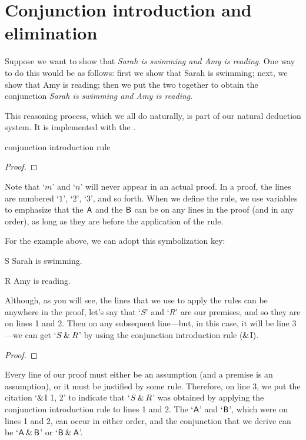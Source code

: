 \section{Conjunction introduction and elimination}\label{s:conj-rule}

Suppose we want to show that \textit{Sarah is swimming and Amy is reading}. One way to do this would be as follows: first we show that Sarah is swimming; next, we show that Amy is reading; then we put the two together to obtain the conjunction \textit{Sarah is swimming and Amy is reading}.

This reasoning process, which we all do naturally, is part of our natural deduction system. It is implemented with the . 
\begin{factboxy}{conjunction introduction rule}
\begin{proof}
	 
\end{proof}
\tcblower
\footnotesize{Note that `$m$' and `$n$' will never appear in an actual proof. In a proof, the lines are numbered `$1$', `$2$', `$3$', and so forth. When we define the rule, we use variables to emphasize that the $\mathsf{A}$ and the $\mathsf{B}$ can be on any lines in the proof (and in any order), as long as they are before the application of the rule.}
\end{factboxy}

For the example above, we can adopt this symbolization key:
	\begin{ekey}
		\item[S] Sarah is swimming.
		\item[R] Amy is reading.
	\end{ekey}
Although, as you will see, the lines that we use to apply the rules can be anywhere in the proof, let's say that `$S$' and `$R$' are our premises, and so they are on lines 1 and 2. Then on any subsequent line---but, in this case, it will be line 3---we can get `$S \mathbin{\&} R$' by using the conjunction introduction rule ($\mathbin{\&}$I).
\begin{proof}
	 \pr{}
	 \pr{}
	 
\end{proof}

Every line of our proof must either be an assumption (and a premise is an assumption), or it must be justified by some rule. Therefore, on line 3, we put the citation `$\mathbin{\&}$I 1, 2' to indicate that `$S \mathbin{\&} R$' was obtained by applying the conjunction introduction rule to lines 1 and 2. The `$\mathsf{A}$' and `$\mathsf{B}$', which were on lines 1 and 2, can occur in either order, and the conjunction that we derive can be `$\mathsf{A} \mathbin{\&} \mathsf{B}$' or `$\mathsf{B} \mathbin{\&} \mathsf{A}$'.

